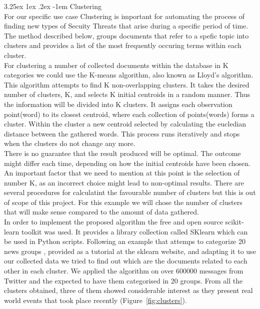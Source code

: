 \documentclass[12pt]{article}
\makeatletter
\renewcommand\paragraph{\@startsection{paragraph}{5}{\z@}%
  {3.25ex \@plus1ex \@minus.2ex}%
  {-1em}%
  {\normalfont\normalsize\bfseries}}
\makeatother
\begin{document}
\paragraph{Clustering}
\hfill \break 
\\
For our specific use case Clustering is important for automating the process of finding new types of Secuity Threats that arise during a specific period of time. 
\hfill \break 
\\
The method described below, groups documents that refer to a spefic topic into clusters and provides a list of the most frequently occuring terms within each cluster.
\hfill \break 
\\
For clustering a number of collected documents within the database in K categories we could use the K-means\cite{k-means} algorithm, also known as Lloyd's algorithm. This algorithm \cite{k-means-example} attempts to find K non-overlapping clusters. It takes the desired number of clusters, K, and selects K initial centroids in a  random manner. Thus the information will be divided into K clusters. It assigns each observation point(word) to its closest centroid, where each collection of points(words) forms a cluster. Within the cluster a new centroid selected by calculating the eucledian distance between the gathered words. This process runs iteratively and stops when the clusters do not change any more.
\hfill \break 
\\ 
There is no guarantee that the result produced will be optimal. The outcome might differ each time, depending on how the initial centroids have been chosen. An important factor that we need to mention at this point is the selection of number K, as an incorrect choice might lead to non-optimal results. There are several procedures\cite{procedures-for-kmeans} for calculatint the favourable number of clusters but this is out of scope of this project. For this example we will chose the number of clusters that will make sense compared to the amount of data gathered.
\hfill \break 
\\
In order to implement the proposed algorithm the free and open source scikit-learn \cite{sklearn} toolkit was used. It provides a library collection called SKlearn which can be used in Python scripts. Following an example that attemps to categorize 20 news groups \cite{k-means-20news}, provided as a tutorial at the sklearn website, and adapting it to use our collected data we tried to find out which are the documents related to each other in each cluster. We applied the algorithm on over 600000 messages from Twitter and the expected to have them categorised in 20 groups. From all the clusters obtained, three of them showed considerable interest as they present real world events that took place recently (Figure~\ref{fig:clusters}). 
\end{document}
